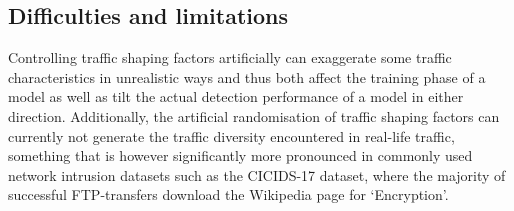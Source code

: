\documentclass[conference]{IEEEtran}
\begin{document}







\subsection{Difficulties and limitations}


Controlling traffic shaping factors artificially can exaggerate some traffic characteristics in unrealistic ways and thus both affect the training phase of a model as well as tilt the actual detection performance of a model in either direction. Additionally, the artificial randomisation of traffic shaping factors can currently not generate the traffic diversity encountered in real-life traffic, something that is however significantly more pronounced in commonly used network intrusion datasets such as the CICIDS-17 dataset, where the majority of successful FTP-transfers download the Wikipedia page for ‘Encryption’.
\end{document}
